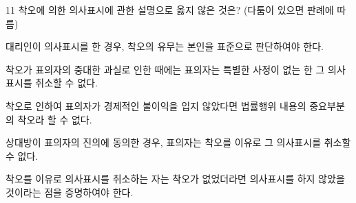 \begin{question}{11}
착오에 의한 의사표시에 관한 설명으로 옳지 않은 것은? (다툼이 있으면 판례에 따름)
\begin{choices}
  \item 대리인이 의사표시를 한 경우, 착오의 유무는 본인을 표준으로 판단하여야 한다.
  \item 착오가 표의자의 중대한 과실로 인한 때에는 표의자는 특별한 사정이 없는 한 그 의사표시를 취소할 수 없다.
  \item 착오로 인하여 표의자가 경제적인 불이익을 입지 않았다면 법률행위 내용의 중요부분의 착오라 할 수 없다.
  \item 상대방이 표의자의 진의에 동의한 경우, 표의자는 착오를 이유로 그 의사표시를 취소할 수 없다.
  \item 착오를 이유로 의사표시를 취소하는 자는 착오가 없었더라면 의사표시를 하지 않았을 것이라는 점을 증명하여야 한다.
\end{choices}
\end{question}
